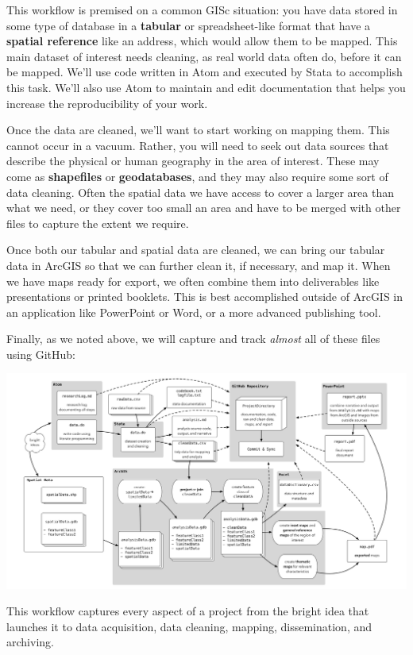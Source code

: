 \documentclass[]{book}
\begin{document}
This workflow is premised on a common GISc situation: you have data
stored in some type of database in a \textbf{tabular} or
spreadsheet-like format that have a \textbf{spatial reference} like an
address, which would allow them to be mapped. This main dataset of
interest needs cleaning, as real world data often do, before it can be
mapped. We'll use code written in Atom and executed by Stata to
accomplish this task. We'll also use Atom to maintain and edit
documentation that helps you increase the reproducibility of your work.

Once the data are cleaned, we'll want to start working on mapping them.
This cannot occur in a vacuum. Rather, you will need to seek out data
sources that describe the physical or human geography in the area of
interest. These may come as \textbf{shapefiles} or
\textbf{geodatabases}, and they may also require some sort of data
cleaning. Often the spatial data we have access to cover a larger area
than what we need, or they cover too small an area and have to be merged
with other files to capture the extent we require.

Once both our tabular and spatial data are cleaned, we can bring our
tabular data in ArcGIS so that we can further clean it, if necessary,
and map it. When we have maps ready for export, we often combine them
into deliverables like presentations or printed booklets. This is best
accomplished outside of ArcGIS in an application like PowerPoint or
Word, or a more advanced publishing tool.

Finally, as we noted above, we will capture and track \emph{almost} all
of these files using GitHub:

\includegraphics[width=1\linewidth]{images/gisFlow2}

This workflow captures every aspect of a project from the bright idea
that launches it to data acquisition, data cleaning, mapping,
dissemination, and archiving.
\end{document}
